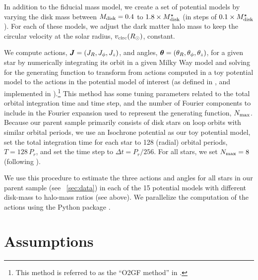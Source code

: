 \documentclass[modern]{aastex63}
\begin{document}
In addition to the fiducial mass model, we create a set of potential models by
varying the disk mass between $M_{\rm disk} = 0.4$ to $1.8 \times M_{\rm
disk}^\star$ (in steps of $0.1\times M_{\rm disk}^\star$).
For each of these models, we adjust the dark matter halo mass to keep the
circular velocity at the solar radius, $v_{\rm circ}(R_\odot)$, constant.

We compute actions, $\boldsymbol{J} = (J_R, J_\phi, J_z)$, and angles, $\boldsymbol{\theta} =
(\theta_R, \theta_\phi, \theta_z)$, for a given star by numerically integrating
its orbit in a given Milky Way model and solving for the generating function to
transform from actions computed in a toy potential model to the actions in the
potential model of interest (as defined in \citealt{Sanders:2014}, and
implemented in ).\footnote{This method is referred to as the
``O2GF method'' in \citet{Sanders:2016}.}
This method has some tuning parameters related to the total orbital integration
time and time step, and the number of Fourier components to include in the
Fourier expansion used to represent the generating function, $N_{\rm max}$.
Because our parent sample primarily consists of disk stars on loop orbits with
similar orbital periods, we use an Isochrone potential as our toy potential
model, set the total integration time for each star to 128 (radial) orbital
periods, $T=128\,P_r$, and set the time step to $\Delta t = P_r / 256$.
For all stars, we set $N_{\rm max} = 8$ (following \citealt{Sanders:2016}).

We use this procedure to estimate the three actions and angles for all stars in
our parent sample (see \sectionname~\ref{sec:data}) in each of the 15 potential
models with different disk-mass to halo-mass ratios (see above).
We parallelize the computation of the actions using the Python package
 \citep{schwimmbad}.


\section{Assumptions}
\label{sec:assumptions}
\end{document}

